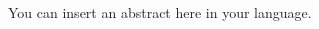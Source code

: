 \newpage
\begin{changemargin}{1cm}{1cm}

\begin{Abstract}
\thispagestyle{plain}
\vspace{1cm}



You can insert an abstract here in your language.





\end{Abstract}
\end{changemargin}
